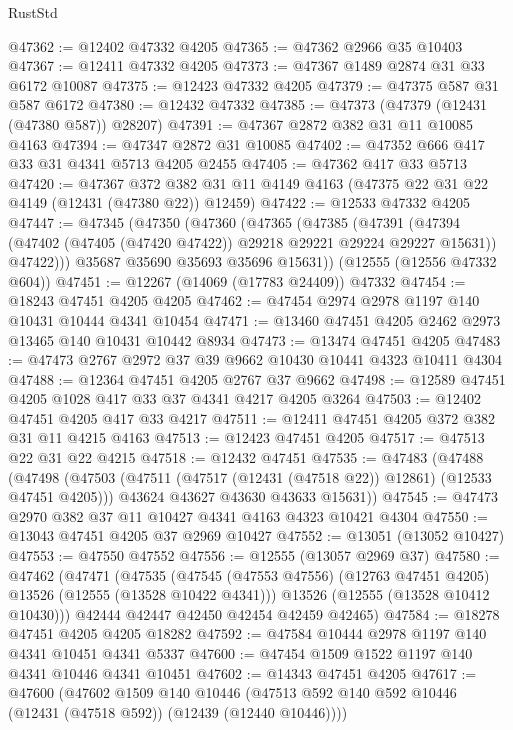 \begin{lexlean}{RustStd}
\begin{coremodule}
@47362 := @12402 @47332 @4205
@47365 := @47362 @2966 @35 @10403
@47367 := @12411 @47332 @4205
@47373 := @47367 @1489 @2874 @31 @33 @6172 @10087
@47375 := @12423 @47332 @4205
@47379 := @47375 @587 @31 @587 @6172
@47380 := @12432 @47332
@47385 := @47373 (@47379 (@12431 (@47380 @587)) @28207)
@47391 := @47367 @2872 @382 @31 @11 @10085 @4163
@47394 := @47347 @2872 @31 @10085
@47402 := @47352 @666 @417 @33 @31 @4341 @5713 @4205 @2455
@47405 := @47362 @417 @33 @5713
@47420 := @47367
    @372
    @382
    @31
    @11
    @4149
    @4163
    (@47375 @22 @31 @22 @4149 (@12431 (@47380 @22)) @12459)
@47422 := @12533 @47332 @4205
@47447 := @47345
    (@47350
      (@47360
        (@47365
          (@47385
            (@47391
              (@47394 (@47402 (@47405 (@47420 @47422)) @29218 @29221 @29224 @29227 @15631))
              @47422)))
        @35687
        @35690
        @35693
        @35696
        @15631))
    (@12555 (@12556 @47332 @604))
@47451 := @12267 (@14069 (@17783 @24409)) @47332
@47454 := @18243 @47451 @4205 @4205
@47462 := @47454 @2974 @2978 @1197 @140 @10431 @10444 @4341 @10454
@47471 := @13460 @47451 @4205 @2462 @2973 @13465 @140 @10431 @10442 @8934
@47473 := @13474 @47451 @4205
@47483 := @47473 @2767 @2972 @37 @39 @9662 @10430 @10441 @4323 @10411 @4304
@47488 := @12364 @47451 @4205 @2767 @37 @9662
@47498 := @12589 @47451 @4205 @1028 @417 @33 @37 @4341 @4217 @4205 @3264
@47503 := @12402 @47451 @4205 @417 @33 @4217
@47511 := @12411 @47451 @4205 @372 @382 @31 @11 @4215 @4163
@47513 := @12423 @47451 @4205
@47517 := @47513 @22 @31 @22 @4215
@47518 := @12432 @47451
@47535 := @47483
    (@47488
      (@47498
        (@47503 (@47511 (@47517 (@12431 (@47518 @22)) @12861) (@12533 @47451 @4205)))
        @43624
        @43627
        @43630
        @43633
        @15631))
@47545 := @47473 @2970 @382 @37 @11 @10427 @4341 @4163 @4323 @10421 @4304
@47550 := @13043 @47451 @4205 @37 @2969 @10427
@47552 := @13051 (@13052 @10427)
@47553 := @47550 @47552
@47556 := @12555 (@13057 @2969 @37)
@47580 := @47462
    (@47471
      (@47535
        (@47545 (@47553 @47556) (@12763 @47451 @4205) @13526 (@12555 (@13528 @10422 @4341)))
        @13526
        (@12555 (@13528 @10412 @10430)))
      @42444
      @42447
      @42450
      @42454
      @42459
      @42465)
@47584 := @18278 @47451 @4205 @4205 @18282
@47592 := @47584 @10444 @2978 @1197 @140 @4341 @10451 @4341 @5337
@47600 := @47454 @1509 @1522 @1197 @140 @4341 @10446 @4341 @10451
@47602 := @14343 @47451 @4205
@47617 := @47600
    (@47602
      @1509
      @140
      @10446
      (@47513 @592 @140 @592 @10446 (@12431 (@47518 @592)) (@12439 (@12440 @10446))))

\end{coremodule}
\end{lexlean}
